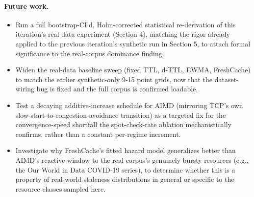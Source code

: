 \documentclass[11pt,letterpaper]{article}
\begin{document}
\paragraph{Future work.}
\begin{itemize}
\item Run a full bootstrap-CI'd, Holm-corrected statistical re-derivation of this iteration's real-data
  experiment (Section 4), matching the rigor already applied to the previous iteration's synthetic run in
  Section 5, to attach formal significance to the real-corpus dominance finding.
\item Widen the real-data baseline sweep (fixed TTL, d-TTL, EWMA, FreshCache) to match the earlier
  synthetic-only 9-15 point grids, now that the dataset-wiring bug is fixed and the full corpus is
  confirmed loadable.
\item Test a decaying additive-increase schedule for AIMD (mirroring TCP's own slow-start-to-congestion-avoidance
  transition) as a targeted fix for the convergence-speed shortfall the spot-check-rate ablation
  mechanistically confirms, rather than a constant per-regime increment.
\item Investigate why FreshCache's fitted hazard model generalizes better than AIMD's reactive window to the
  real corpus's genuinely bursty resources (e.g., the Our World in Data COVID-19 series), to determine
  whether this is a property of real-world staleness distributions in general or specific to the resource
  classes sampled here.
\end{itemize}



\end{document}
